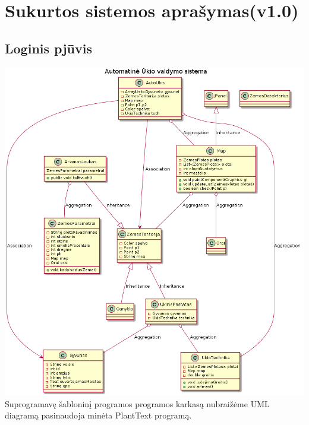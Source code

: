 \documentclass[oneside]{VUMIFPSkursinis}
\begin{document}
\section{Sukurtos sistemos aprašymas(v1.0)}

\subsection{Loginis pjūvis}
	\includegraphics[width=\textwidth,height=\textheight,keepaspectratio]{uml.png}	
	Suprogramavę šabloninį programos programos karkasą nubraižėme UML diagramą pasinaudoja minėta PlantText programą. 
\end{document}
